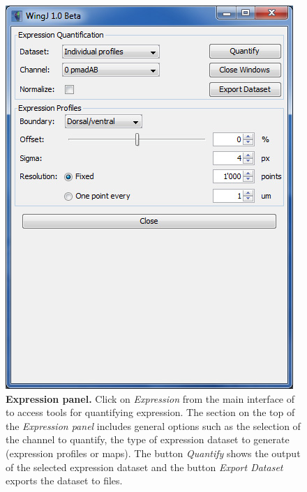 \begin{figure}[!h]
\centering
\includegraphics[scale=0.7]{images/expression_panel_1.jpg}
\caption{\textbf{Expression panel.} Click on \textit{Expression} from the main interface of \wingj to access tools for quantifying expression. The section on the top of the \textit{Expression panel} includes general options such as the selection of the channel to quantify, the type of expression dataset to generate (expression profiles or maps). The button \textit{Quantify} shows the output of the selected expression dataset and the button \textit{Export Dataset} exports the dataset to files.}
\label{fig:wingj_expression_interface}
\end{figure}


